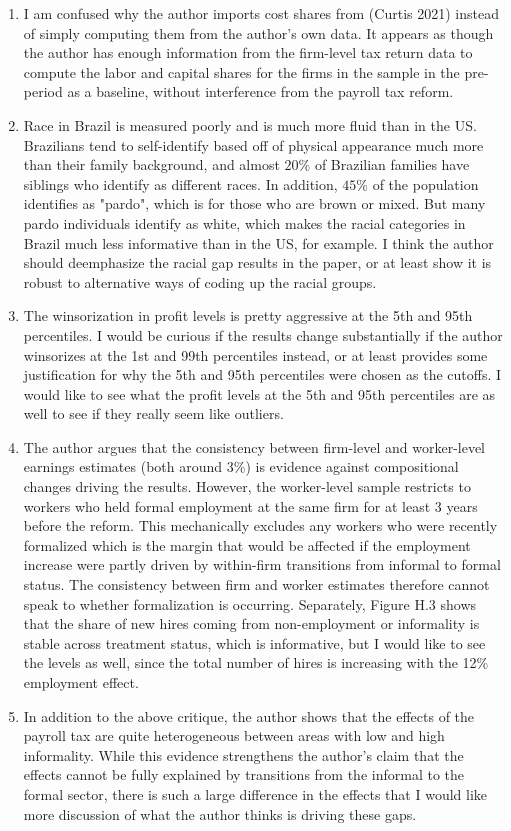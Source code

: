 \documentclass{article}
\begin{document}
\begin{enumerate}
    \item I am confused why the author imports cost shares from (Curtis 2021) instead of simply computing them from the author's own data. 
    It appears as though the author has enough information from the firm-level tax return data to compute the labor and capital shares for the firms in the sample in the pre-period as a baseline, 
    without interference from the payroll tax reform. 
    \item Race in Brazil is measured poorly and is much more fluid than in the US. 
    Brazilians tend to self-identify based off of physical appearance much more than their family background, 
    and almost $20\%$ of Brazilian families have siblings who identify as different races. In addition, $45\%$ of the population identifies as "pardo", 
    which is for those who are brown or mixed. But many pardo individuals identify as white, which makes the racial categories in Brazil much less informative than in the US, for example. 
    I think the author should deemphasize the racial gap results in the paper, or at least show it is robust to alternative ways of coding up the racial groups. 
    \item The winsorization in profit levels is pretty aggressive at the 5th and 95th percentiles. I would be curious if the results change substantially if the author winsorizes at the 1st and 99th percentiles instead, or at least 
    provides some justification for why the 5th and 95th percentiles were chosen as the cutoffs. I would like to see what the profit levels at the 5th and 95th percentiles are as well to see if they really seem like outliers. 
    \item The author argues that the consistency between firm-level and worker-level earnings estimates (both around 3\%) is evidence against compositional changes driving the results. 
    However, the worker-level sample restricts to workers who held formal employment at the same firm for at least 3 years before the reform. This mechanically excludes any workers who were recently formalized which is the margin that would be affected if the employment increase were partly driven by within-firm transitions from informal to formal status. The consistency between firm and worker estimates therefore cannot speak to whether formalization is occurring. 
    Separately, Figure H.3 shows that the share of new hires coming from non-employment or informality is stable across treatment status, which is informative, 
    but I would like to see the levels as well, since the total number of hires is increasing with the 12\% employment effect. 
    \item In addition to the above critique, the author shows that the effects of the payroll tax are quite heterogeneous between areas with low and high informality. 
    While this evidence strengthens the author's claim that the effects cannot be fully explained by transitions from the informal to the formal sector, there is such a large difference in the effects that I would like more discussion of what the author thinks is driving these gaps. 
\end{enumerate}
\end{document}

